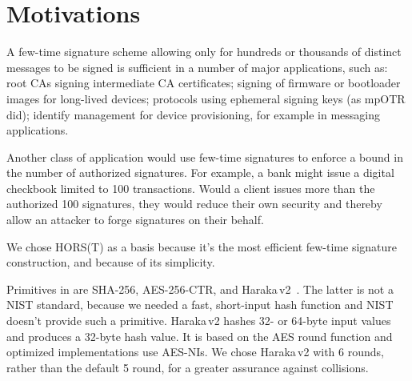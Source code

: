 \section{Motivations}

A few-time signature scheme allowing only for hundreds or thousands of
distinct messages to be signed is sufficient in a number of major
applications, such as:
root CAs signing intermediate CA certificates; signing of firmware or bootloader images for long-lived devices; protocols using ephemeral signing keys (as mpOTR did); identify management for device provisioning, for example in messaging applications.

Another class of application would use few-time signatures to enforce a bound in the number of authorized signatures.
For example, a bank might issue a digital checkbook limited to 100 transactions.
Would a client issues more than the authorized 100 signatures, they would reduce their own security and thereby allow an attacker to forge signatures on their behalf.


We chose HORS(T) as a basis because it's the most efficient few-time signature construction, and because of its simplicity.

Primitives in \gravity are SHA-256, AES-256-CTR, and Haraka\,v2~\cite{haraka}.
The latter is not a NIST standard, because we needed a fast, short-input hash function and NIST doesn't provide such a primitive.
Haraka\,v2 hashes 32- or 64-byte input values and produces a 32-byte hash value.
It is based on the AES round function and optimized implementations use AES-NIs.
We chose Haraka\,v2 with 6 rounds, rather than the default 5 round, for a greater assurance against collisions.